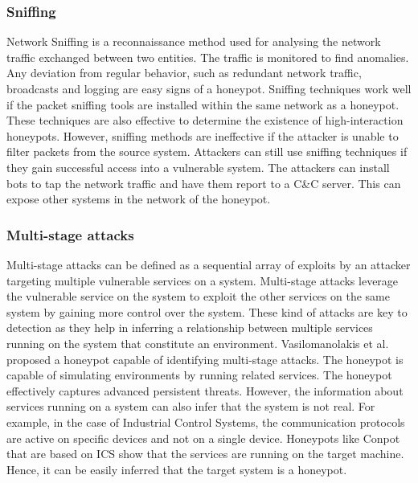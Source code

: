 \documentclass[letterpaper, 10 pt, conference]{ieeeconf}  %
\begin{document}
\subsubsection{Sniffing}
Network Sniffing is a reconnaissance method used for analysing the network traffic exchanged between two entities. The traffic is monitored to find anomalies. Any deviation from regular behavior, such as redundant network traffic, broadcasts and logging are easy signs of a honeypot. Sniffing techniques work well if the packet sniffing tools are installed within the same network as a honeypot. These techniques are also effective to determine the existence of high-interaction honeypots. However, sniffing methods are ineffective if the attacker is unable to filter packets from the source system. Attackers can still use sniffing techniques if they gain successful access into a vulnerable system. The attackers can install bots to tap the network traffic and have them report to a C\&C server. This can expose other systems in the network of the honeypot. 
\newline
\subsubsection{Multi-stage attacks}
Multi-stage attacks can be defined as a sequential array of exploits by an attacker targeting multiple vulnerable services on a system. Multi-stage attacks leverage the vulnerable service on the system to exploit the other services on the same system by gaining more control over the system. These kind of attacks are key to detection as they help in inferring a relationship between multiple services running on the system that constitute an environment. Vasilomanolakis et al. \cite{vasilomanolakis} proposed a honeypot capable of identifying multi-stage attacks. The honeypot is capable of simulating environments by running related services. The honeypot effectively captures advanced persistent threats. However, the information about services running on a system can also infer that the system is not real. For example, in the case of Industrial Control Systems, the communication protocols are active on specific devices and not on a single device. Honeypots like Conpot that are based on ICS show that the services are running on the target machine. Hence, it can be easily inferred that the target system is a honeypot. 
\newline
\end{document}
